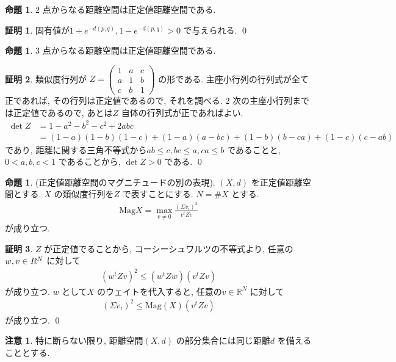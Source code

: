 \documentclass[10pt, fleqn, label-section=none]{bxjsarticle}
\theoremstyle{definition}
\newtheorem{prop}[dfn]{命題}
\newtheorem*{pf*}{証明}
\newtheorem{remark}[dfn]{注意}
\renewcommand{\;}{\, ; \,}
\newcommand{\gyouretsu}[1]{\begin{pmatrix} #1 \end{pmatrix} }
\newcommand{\Mag}{\textrm{Mag}}
\begin{document}
\begin{prop}$2$ 点からなる距離空間は正定値距離空間である. 

\end{prop}
\begin{pf*}
固有値が$1 + e^{-d(p,q)}, 1 - e^{-d(p,q)} > 0$ で与えられる. 
\qed
\end{pf*}

\begin{prop}$3$ 点からなる距離空間は正定値距離空間である. 

\end{prop}
\begin{pf*}類似度行列が
$Z  =\gyouretsu{1 & a & c \\
a& 1 & b \\
c & b& 1 } $ の形である. 主座小行列の行列式が全て正であれば, その行列は正定値であるので, それを調べる. $2$ 次の主座小行列までは正定値であるので, あとは$Z$ 自体の行列式が正であればよい. 
\begin{align*} \det Z  &=1 - a^2 - b^2 - c^2 + 2abc \\&= (1-a)(1-b)(1-c)+ (1-a)(a- bc) + (1-b)(b- ca) + (1-c)(c- ab) \end{align*}
であり, 距離に関する三角不等式から$ab \leq c, bc \leq a, ca \leq b$ であることと, $0 < a, b, c < 1$ であることから, $\det Z > 0$ である.  
\qed
\end{pf*}



\begin{prop}(正定値距離空間のマグニチュードの別の表現). $(X, d)$ を正定値距離空間とする. $X$ の類似度行列を$Z$ で表すことにする. $N = \#X$ とする.
\begin{align*} \Mag X = \max_{v \neq 0} \frac{ (\Sigma v_i )^2 }{v^t Z v}  \end{align*}
が成り立つ.
\end{prop}
\begin{pf*}$Z$ が正定値でることから, 
コーシーシュワルツの不等式より, 任意の$w, v \in \mathbb \mathbb R^N$ に対して
\begin{align*} (w^t Z v) ^2  \leq (w^t Z w)(v^t Z v)  \end{align*}
が成り立つ. $w$ として$X$ のウェイトを代入すると, 任意の$v \in \mathbb R^N$ に対して
\begin{align*} (\Sigma v_i) ^2  \leq \Mag (X) (v^t Z v)  \end{align*}
が成り立つ. 
\qed
\end{pf*}

\begin{remark}
特に断らない限り, 距離空間$(X, d)$ の部分集合には同じ距離$d$ を備えることとする. 
\end{remark}
\end{document}
